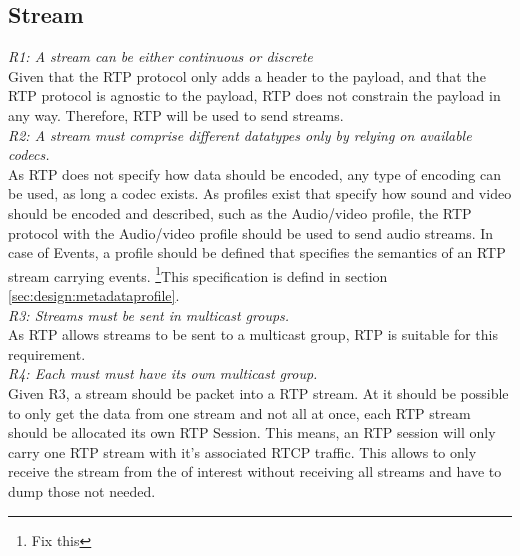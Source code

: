 


\subsection{Stream}
\textit{R1: A stream can be either continuous or discrete} \\
Given that the RTP protocol only adds a header to the payload, and that the RTP protocol is agnostic to the payload, RTP does not constrain the payload in any way. Therefore, RTP will be used to send streams.\\

\noindent\textit{R2: A stream must comprise different datatypes only by relying on available codecs.}\\
As RTP does not specify how data should be encoded, any type of encoding can be used, as long a codec exists. As profiles exist that specify how sound and video should be encoded and described, such as the Audio/video profile, the RTP protocol with the Audio/video profile should be used to send audio streams. In case of Events, a profile should be defined that specifies the semantics of an RTP stream carrying events. \footnote{Fix this}This specification is defind in section \ref{sec:design:metadataprofile}. \\

\noindent\textit{R3: Streams must be sent in multicast groups.}\\
As RTP allows streams to be sent to a multicast group, RTP is suitable for this requirement. \\

\noindent\textit{R4: Each must must have its own multicast group.}\\
Given R3, a stream should be packet into a RTP stream. At it should be possible to only get the data from one stream and not all at once, each RTP stream should be allocated its own RTP Session. This means, an RTP session will only carry one RTP stream with it's associated RTCP traffic. This allows  to only receive the stream from the  of interest without receiving all streams and have to dump those not needed.\\

